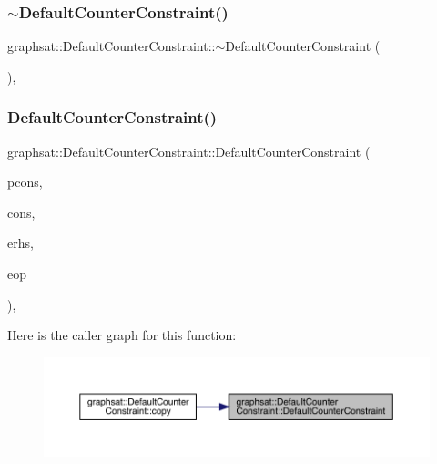 \subsubsection{\texorpdfstring{$\sim$DefaultCounterConstraint()}{~DefaultCounterConstraint()}}
{\footnotesize\ttfamily graphsat\+::\+Default\+Counter\+Constraint\+::$\sim$\+Default\+Counter\+Constraint (\begin{DoxyParamCaption}{ }\end{DoxyParamCaption})\hspace{0.3cm}{\ttfamily [inline]}, {\ttfamily [protected]}}

\mbox{\label{classgraphsat_1_1_default_counter_constraint_ae77bcab173109e73923e98a5d1694d70}} 
\subsubsection{\texorpdfstring{DefaultCounterConstraint()}{DefaultCounterConstraint()}}
{\footnotesize\ttfamily graphsat\+::\+Default\+Counter\+Constraint\+::\+Default\+Counter\+Constraint (\begin{DoxyParamCaption}\item[{const vector$<$ int $>$ \&}]{pcons,  }\item[{const vector$<$ int $>$ \&}]{cons,  }\item[{int}]{erhs,  }\item[{\mbox{\hyperlink{namespacegraphsat_acfb5939f9bdafbd9aea0d084b9a56f69}{C\+O\+M\+P\+\_\+\+O\+P\+E\+R\+A\+T\+OR}}}]{eop }\end{DoxyParamCaption})\hspace{0.3cm}{\ttfamily [inline]}, {\ttfamily [private]}}

Here is the caller graph for this function\+:
\nopagebreak
\begin{figure}[H]
\begin{center}
\leavevmode
\includegraphics[width=350pt]{classgraphsat_1_1_default_counter_constraint_ae77bcab173109e73923e98a5d1694d70_icgraph}
\end{center}
\end{figure}


